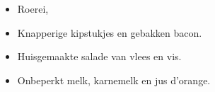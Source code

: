 \begin{itemize}
	\item Roerei,
	\item Knapperige kipstukjes en gebakken bacon.
	\item Huisgemaakte salade van vlees en vis.
	\item Onbeperkt melk, karnemelk en jus d’orange.
\end{itemize}

